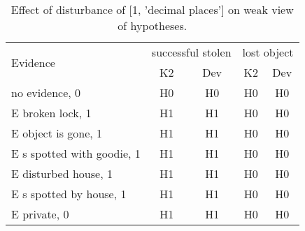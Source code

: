 \begin{table}\begin{tabular}{l|cc|cc}\toprule\multirow{2}{*}{Evidence} & \multicolumn{2}{c}{successful stolen}& \multicolumn{2}{c}{lost object}\\& {K2} & {Dev}& {K2} & {Dev}\\\midrule
no evidence, 0 & H0&H0&H0&H0\\E broken lock, 1 & H1&H1&H0&H0\\E object is gone, 1 & H1&H1&H0&H0\\E s spotted with goodie, 1 & H1&H1&H0&H0\\E disturbed house, 1 & H1&H1&H0&H0\\E s spotted by house, 1 & H1&H1&H0&H0\\E private, 0 & H1&H1&H0&H0\\\bottomrule\end{tabular}\caption{Effect of disturbance of [1, 'decimal places'] on weak view of hypotheses.}\end{table}